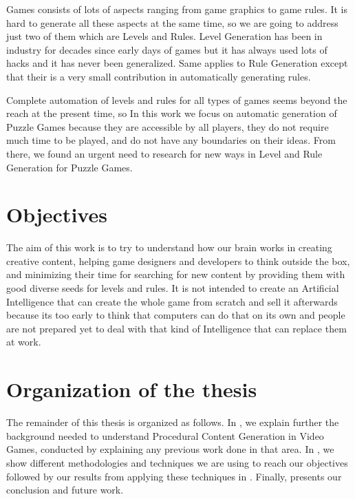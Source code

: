 Games consists of lots of aspects ranging from game graphics to game rules. It is hard to generate all these aspects at the same time, so we are going to address just two of them which are Levels and Rules. Level Generation has been in industry for decades since early days of games \cite{pcgFirstGame} but it has always used lots of hacks and it has never been generalized. Same applies to Rule Generation except that their is a very small contribution in automatically generating rules.\\\par

Complete automation of levels and rules for all types of games seems beyond the reach at the present time, so In this work we focus on automatic generation of Puzzle Games because they are accessible by all players, they do not require much time to be played, and do not have any boundaries on their ideas. From there, we found an urgent need to research for new ways in Level and Rule Generation for Puzzle Games.

\section{Objectives}
The aim of this work is to try to understand how our brain works in creating creative content, helping game designers and developers to think outside the box, and minimizing their time for searching for new content by providing them with good diverse seeds for levels and rules. It is not intended to create an Artificial Intelligence that can create the whole game from scratch and sell it afterwards because its too early to think that computers can do that on its own and people are not prepared yet to deal with that kind of Intelligence that can replace them at work.


\section{Organization of the thesis}
The remainder of this thesis is organized as follows. In , we explain further the background needed to understand Procedural Content Generation in Video Games, conducted by  explaining any previous work done in that area. In , we show different methodologies and techniques we are using to reach our objectives followed by our results from applying these techniques in . Finally,  presents our conclusion and future work.